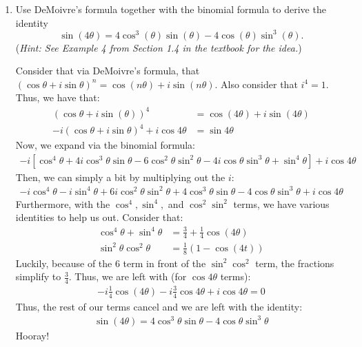 \begin{enumerate}
	\item Use DeMoivre's formula together with the binomial formula to derive the identity
	\[\sin(4\theta) = 4\cos^3(\theta)\sin(\theta) - 4\cos(\theta)\sin^3(\theta). \]
		({\it Hint: See Example 4 from Section 1.4 in the textbook for the idea.})
	\begin{problem}
		Consider that via DeMoivre's formula, that $(\cos\theta + i\sin\theta)^n=\cos(n\theta)+i\sin(n\theta)$. Also consider that $i^4 = 1$. Thus, we have that:
		\begin{align*}
			(\cos\theta + i\sin(\theta))^4&= \cos(4\theta)+i\sin(4\theta)\\
			-i(\cos\theta + i\sin\theta)^4 + i\cos4\theta &= \sin4\theta
		\end{align*}
		Now, we expand via the binomial formula:
		\begin{align*}
			-i[\cos^4\theta + 4i\cos^3\theta\sin\theta -6 \cos^2\theta\sin^2\theta -4i\cos\theta\sin^3\theta+\sin^4\theta] +i\cos4\theta
		\end{align*}
		Then, we can simply a bit by multiplying out the $i$:
		\begin{align*}
			-i\cos^4\theta -i\sin^4\theta +6i\cos^2\theta\sin^2\theta + 4\cos^3\theta\sin\theta - 4\cos\theta\sin^3\theta + i\cos 4\theta
		\end{align*}
		Furthermore, with the $\cos^4, \sin^4,$ and $\cos^2\sin^2$ terms, we have various identities to help us out. Consider that:
		\begin{align*}
			\cos^4\theta + \sin^4\theta &= \frac{3}4+\frac{1}4\cos(4\theta)\\
			\sin^2\theta\cos^2\theta &= \frac{1}8(1-\cos(4t))
		\end{align*}
		Luckily, because of the 6 term in front of the $\sin^2\cos^2$ term, the fractions simplify to $\frac{3}4$. Thus, we are left with (for $\cos 4\theta$ terms):
		\begin{align*}
			-i\frac{1}4\cos(4\theta)-i\frac{3}{4}\cos 4\theta + i\cos 4\theta = 0
		\end{align*}
		Thus, the rest of our terms cancel and we are left with the identity:
		\begin{align*}
			\sin(4\theta) = 4\cos^3\theta\sin\theta - 4\cos\theta\sin^3\theta
		\end{align*}
		Hooray!
	\end{problem}
\end{enumerate}


